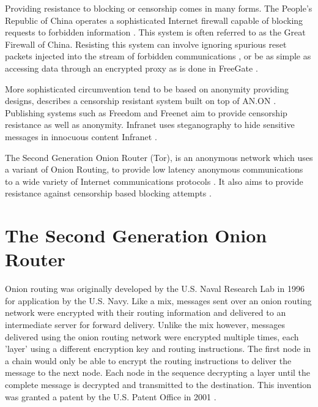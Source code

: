 \documentclass{ecuthesis}
\begin{document}
Providing resistance to blocking or censorship comes in many forms. The People's
Republic of China operates a sophisticated Internet firewall capable of blocking
requests to forbidden information \parencite{The-OpenNet-Initiative:2009uq}.
This system is often referred to as the Great Firewall of China. Resisting this
system can involve ignoring spurious reset packets injected into the stream of
forbidden communications \parencite{springerlink:10.1007/11957454-2}, or be as
simple as accessing data through an encrypted proxy as is done in FreeGate
\parencite{Smart:2008kx}.

More sophisticated circumvention tend to be based on anonymity providing
designs, \textcite{Kopsell:2004:ABR:1029179.1029197} describes a censorship
resistant system built on top of AN.ON
\parencite{springerlink:10.1007/3-540-44702-4-7}. Publishing systems such as
Freedom \parencite{Goldberg:1999p2231} and Freenet \parencite{Clarke:2001p2435}
aim to provide censorship resistance as well as anonymity. Infranet uses
steganography to hide sensitive messages in innocuous content Infranet
\parencite{Feamster:2002p307}.

The Second Generation Onion Router (Tor), is an anonymous network which uses a
variant of Onion Routing, to provide low latency anonymous communications to a
wide variety of Internet communications protocols
\parencite{Dingledine:2004p314}. It also aims to provide resistance against
censorship based blocking attempts \parencite{Dingledine:2008p1542}.

\section{The Second Generation Onion Router}

Onion routing was originally developed by the U.S. Naval Research Lab in 1996
\parencite{Goldschlag:1996wy} for application by the U.S. Navy. Like a mix,
messages sent over an onion routing network were encrypted with their routing
information and delivered to an intermediate server for forward delivery.
Unlike the mix however, messages delivered using the onion routing network were
encrypted multiple times, each 'layer' using a different encryption key and
routing instructions. The first node in a chain would only be able to encrypt
the routing instructions to deliver the message to the next node. Each node in
the sequence decrypting a layer until the complete message is decrypted and
transmitted to the destination. This invention was granted a patent by the U.S.
Patent Office in 2001 \parencite{Michael:2001}.
\end{document}

